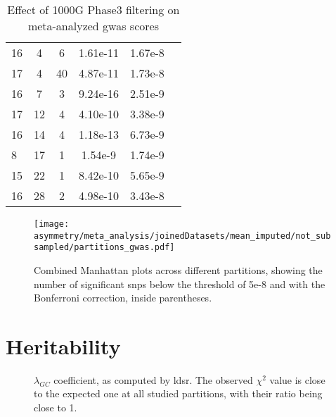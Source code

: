 \begin{table}[H]
{\begin{tabular}{lccccc}
	16 &4 &6 &1.61e-11 &1.67e-8 \\
	17 &4 &40 &4.87e-11 &1.73e-8 \\
	16 &7 &3 &9.24e-16 &2.51e-9 \\
	17 &12 &4 &4.10e-10 &3.38e-9 \\
	16 &14 &4 &1.18e-13 &6.73e-9 \\
	8 &17 &1 &1.54e-9 &1.74e-9 \\
	15 &22 &1 &8.42e-10 &5.65e-9 \\
	16 &28 &2 &4.98e-10 &3.43e-8 \\
	\bottomrule
\end{tabular}
\label{tab:1000g_lost_bonf_chr}
}
\caption{Effect of 1000G Phase3 filtering on meta-analyzed \ac{gwas} scores} 

\end{table}


\begin{figure}
\begin{adjustwidth}{-3 cm}{-2.5 cm}\centering
	

	\texttt{[image: asymmetry/meta\_analysis/joinedDatasets/mean\_imputed/not\_subsampled/partitions\_gwas.pdf]}
	\caption[Combined Manhattan plots across different partitions]{Combined Manhattan plots across different partitions, showing the number of significant \acp{snp} below the threshold of 5e-8 and with the Bonferroni correction, inside parentheses.}
	\label{fig:part_manhattan}


\end{adjustwidth}
\end{figure}
\chapter{Heritability}
\begin{figure}[H]
	\centering

\caption[$\lambda_{GC}$ coefficient, as computed by LDSR]{$\lambda_{GC}$ coefficient, as computed by \ac{ldsr}. The observed $\chi^2$ value is close to the expected one at all studied partitions, with their ratio being close to 1.}	
\end{figure}
